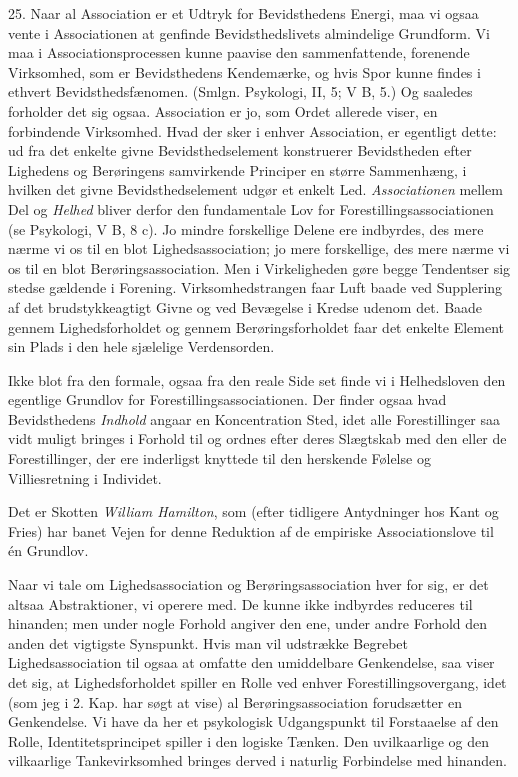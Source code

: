 \documentclass[12pt,a4paper,openany]{book}
\newcommand{\opage}[1]{\marginnote{\footnotesize\textit{[#1]}}}
\begin{document}
\setcounter{footnote}{0}%
\opage{58}25. Naar al Association er et Udtryk for Bevidsthedens Energi, maa vi
ogsaa vente i Associationen at genfinde Bevidsthedslivets almindelige
Grundform. Vi maa i Associationsprocessen kunne paavise den sammenfattende,
forenende Virksomhed, som er Bevidsthedens Kendemærke, og hvis Spor kunne
findes i ethvert Bevidsthedsfænomen. (Smlgn. Psykologi, II, 5; V B, 5.) Og
saaledes forholder det sig ogsaa. Association er jo, som Ordet allerede viser,
en forbindende Virksomhed. Hvad der sker i enhver Association, er egentligt
dette: ud fra det enkelte givne Bevidsthedselement konstruerer Bevidstheden
efter Lighedens og Berøringens samvirkende Principer en større Sammenhæng, i
hvilken det givne Bevidsthedselement udgør et enkelt Led. \emph{Associationen}
mellem Del og \emph{Helhed} bliver derfor den fundamentale Lov for
Forestillingsassociationen (se Psykologi, V B, 8 c). Jo mindre forskellige
Delene ere indbyrdes, des mere nærme vi os til en blot Lighedsassociation; jo
mere forskellige, des mere nærme vi os til en blot Berøringsassociation. Men i
Virkeligheden gøre begge Tendentser sig stedse gældende i Forening.
Virksomhedstrangen faar Luft baade ved Supplering af det brudstykkeagtigt Givne
og ved Bevægelse i Kredse udenom det. Baade gennem Lighedsforholdet og gennem
Berøringsforholdet faar det enkelte Element sin Plads i den hele sjælelige
Verdensorden.

Ikke blot fra den formale, ogsaa fra den reale Side set finde vi i Helhedsloven
den egentlige Grundlov for Forestillingsassociationen. Der finder ogsaa hvad
Bevidsthedens \emph{Indhold} angaar en Koncentration Sted, idet alle
Forestillinger saa vidt muligt bringes i Forhold til og ordnes efter deres
Slægtskab med den eller de Forestillinger, der ere inderligst knyttede til den
herskende Følelse og Villiesretning i Individet.

Det er Skotten \emph{William Hamilton}, som (efter tidligere Antydninger hos
Kant og Fries) har banet Vejen for denne Reduktion af de empiriske
Associationslove til én Grundlov.

Naar vi tale om Lighedsassociation og Berøringsassociation hver for sig, er det
altsaa Abstraktioner, vi operere med. De kunne ikke indbyrdes reduceres til
hinanden; men under nogle Forhold angiver den ene, under andre Forhold den
anden det vigtigste Synspunkt. Hvis man vil udstrække Begrebet
Lighedsassociation til ogsaa at omfatte den umiddelbare Genkendelse, saa viser
det sig, at Lighedsforholdet spiller en Rolle ved enhver Forestillingsovergang,
idet (som jeg i 2. Kap. har søgt at vise) al Berøringsassociation forudsætter
en Genkendelse. Vi have da her et psykologisk Udgangspunkt til Forstaaelse af
den Rolle, Identitetsprincipet spiller i den logiske Tænken. Den uvilkaarlige
og den vilkaarlige Tankevirksomhed bringes derved i naturlig Forbindelse med
hinanden.
\end{document}
